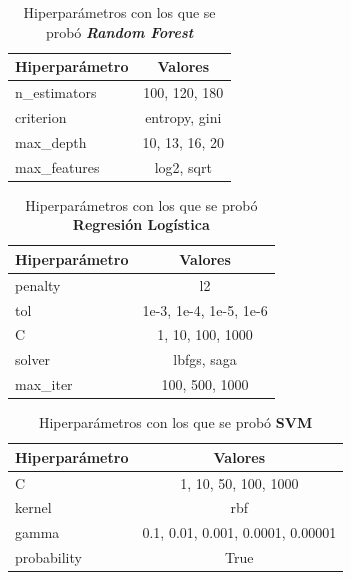 \begin{appendices}
		\begin{table}[ht!]
			\centering
			\caption{Hiperparámetros con los que se probó \textbf{\emph{Random Forest}}}
			\label{table:9}
			\begin{tabular}{lc}
				\toprule
				Hiperparámetro &         Valores \\
				\midrule
				  n\_estimators &   100, 120, 180 \\
					 criterion &   entropy, gini \\
					 max\_depth & 10,  13, 16, 20 \\
				  max\_features &      log2, sqrt \\
				\bottomrule
			\end{tabular}
		\end{table}
			
		

		\begin{table}[ht!]
			\centering
			\caption{Hiperparámetros con los que se probó \textbf{Regresión Logística}}
			\label{table:10}
			\begin{tabular}{lc}
				\toprule
				Hiperparámetro &                Valores \\
				\midrule
					   penalty &                     l2 \\
						   tol & 1e-3, 1e-4, 1e-5, 1e-6 \\
							 C &       1, 10, 100, 1000 \\
						solver &            lbfgs, saga \\
					  max\_iter &         100, 500, 1000 \\
				\bottomrule
			\end{tabular}
		\end{table}
		
		
		\begin{table}[htb]
			\centering
			\caption{Hiperparámetros con los que se probó \textbf{SVM}}
			\label{table:11}
			\begin{tabular}{lc}
			\toprule
			Hiperparámetro &                           Valores \\
			\midrule
						 C &              1, 10, 50, 100, 1000 \\
					kernel &                               rbf \\
					 gamma & 0.1, 0.01, 0.001, 0.0001, 0.00001 \\
			   probability &                              True \\
			\bottomrule
			\end{tabular}
		\end{table}
	


\end{appendices}
